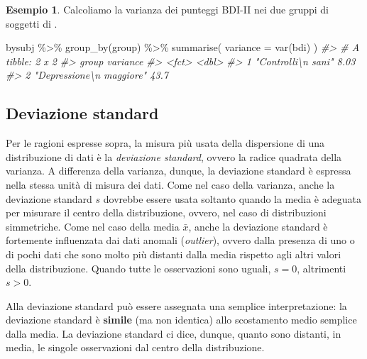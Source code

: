 \documentclass[
  10pt,
  italian,
  a4paper,
  extrafontsizes,onecolumn,openright
  ]{memoir}
\newenvironment{Shaded}{\begin{snugshade}}{\end{snugshade}}
\newcommand{\AttributeTok}[1]{\textcolor[rgb]{0.77,0.63,0.00}{#1}}
\newcommand{\CommentTok}[1]{\textcolor[rgb]{0.56,0.35,0.01}{\textit{#1}}}
\newcommand{\FunctionTok}[1]{\textcolor[rgb]{0.00,0.00,0.00}{#1}}
\newcommand{\NormalTok}[1]{#1}
\newcommand{\SpecialCharTok}[1]{\textcolor[rgb]{0.00,0.00,0.00}{#1}}
\theoremstyle{definition}
\theoremstyle{definition}
\newtheorem{example}{Esempio}[chapter]
\theoremstyle{definition}
\theoremstyle{definition}
\theoremstyle{remark}
\begin{document}
\begin{example}

Calcoliamo la varianza dei punteggi BDI-II nei due gruppi di soggetti di \textcite{zetschefuture2019}.

\begin{Shaded}
\begin{Highlighting}[]
\NormalTok{bysubj }\SpecialCharTok{\%\textgreater{}\%} 
  \FunctionTok{group\_by}\NormalTok{(group) }\SpecialCharTok{\%\textgreater{}\%} 
  \FunctionTok{summarise}\NormalTok{(}
    \AttributeTok{variance =} \FunctionTok{var}\NormalTok{(bdi)}
\NormalTok{  ) }
\CommentTok{\#\textgreater{} \# A tibble: 2 x 2}
\CommentTok{\#\textgreater{}   group                    variance}
\CommentTok{\#\textgreater{}   \textless{}fct\textgreater{}                       \textless{}dbl\textgreater{}}
\CommentTok{\#\textgreater{} 1 "Controlli\textbackslash{}n sani"           8.03}
\CommentTok{\#\textgreater{} 2 "Depressione\textbackslash{}n maggiore"    43.7}
\end{Highlighting}
\end{Shaded}

\end{example}

\hypertarget{deviazione-standard}{%
\subsection{Deviazione standard}\label{deviazione-standard}}

Per le ragioni espresse sopra, la misura più usata della dispersione di una distribuzione di dati è la \emph{deviazione standard}, ovvero la radice quadrata della varianza. A differenza della varianza, dunque, la deviazione standard è espressa nella stessa unità di misura dei dati. Come nel caso della varianza, anche la deviazione standard \(s\) dovrebbe essere usata soltanto quando la media è adeguata per misurare il centro della distribuzione, ovvero, nel caso di distribuzioni simmetriche. Come nel caso della media \(\bar{x}\), anche la deviazione standard è fortemente influenzata dai dati anomali (\emph{outlier}), ovvero dalla presenza di uno o di pochi dati che sono molto più distanti dalla media rispetto agli altri valori della distribuzione. Quando tutte le osservazioni sono uguali, \(s=0\), altrimenti \(s > 0\).

Alla deviazione standard può essere assegnata una semplice interpretazione: la deviazione standard è \textbf{simile} (ma non identica) allo scostamento medio semplice dalla media. La deviazione standard ci dice, dunque, quanto sono distanti, in media, le singole osservazioni dal centro della distribuzione.
\end{document}
